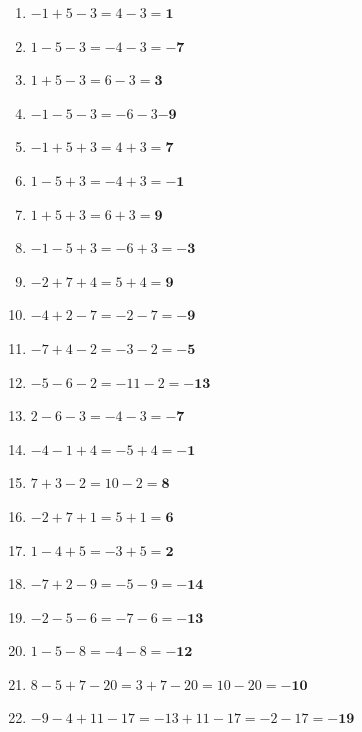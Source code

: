 \documentclass[a4paper,12pt]{article} %
\begin{document}
\begin{enumerate}

  \item \(-1 + 5 - 3 = 4 - 3 = \mathbf{1}\) %

  \item \(1 - 5 - 3 = -4 - 3 = \mathbf{-7}\) %

  \item \(1 + 5 - 3 = 6 - 3 = \mathbf{3}\) %

  \item \(-1 - 5 - 3 = -6 - 3 \mathbf{-9}\) %

  \item \(-1 + 5 + 3 = 4 + 3 = \mathbf{7}\) %

  \item \(1 - 5 + 3 = -4 + 3 = \mathbf{-1}\) %

  \item \(1 + 5 + 3 = 6 + 3 = \mathbf{9}\) %

  \item \(-1 - 5 + 3 = -6 + 3 = \mathbf{-3}\) %

  \item \(-2 + 7 + 4 = 5 + 4 = \mathbf{9}\) %

  \item \(-4 + 2 - 7 = -2 - 7 = \mathbf{-9}\) %

  \item \(-7 + 4 - 2 = -3 - 2 = \mathbf{-5}\) %

  \item \(-5 - 6 - 2 = -11 - 2 = \mathbf{-13}\) %

  \item \(2 - 6 - 3 = -4 - 3 = \mathbf{-7}\) %

  \item \(-4 - 1 + 4 = -5 + 4 = \mathbf{-1}\) %

  \item \(7 + 3 - 2 = 10 - 2 = \mathbf{8}\) %

  \item \(-2 + 7 + 1 = 5 + 1 = \mathbf{6}\) %

  \item \(1 - 4 + 5 = -3 + 5 = \mathbf{2}\) %

  \item \(-7 + 2 - 9 = -5 - 9 = \mathbf{-14}\) %

  \item \(-2 - 5 - 6 = -7 - 6 = \mathbf{-13}\) %

  \item \(1 - 5 - 8 = -4 - 8 = \mathbf{-12}\) %

  \item \(8 - 5 + 7 - 20 = 3 + 7 - 20 = 10 - 20 = \mathbf{-10}\) %

  \item \(-9 - 4 + 11 - 17 = -13 + 11 - 17 = -2 - 17 = \mathbf{-19}\) %

\end{enumerate}
\end{document}
